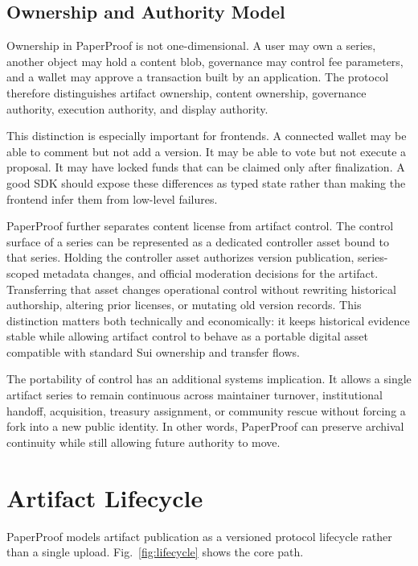 \documentclass[journal]{IEEEtran}
\begin{document}
\subsection{Ownership and Authority Model}

Ownership in PaperProof is not one-dimensional. A user may own a series, another object may hold a content blob, governance may control fee parameters, and a wallet may approve a transaction built by an application. The protocol therefore distinguishes artifact ownership, content ownership, governance authority, execution authority, and display authority.

This distinction is especially important for frontends. A connected wallet may be able to comment but not add a version. It may be able to vote but not execute a proposal. It may have locked funds that can be claimed only after finalization. A good SDK should expose these differences as typed state rather than making the frontend infer them from low-level failures.

PaperProof further separates content license from artifact control. The control
surface of a series can be represented as a dedicated controller asset bound to
that series. Holding the controller asset authorizes version publication,
series-scoped metadata changes, and official moderation decisions for the
artifact. Transferring that asset changes operational control without rewriting
historical authorship, altering prior licenses, or mutating old version
records. This distinction matters both technically and economically: it keeps
historical evidence stable while allowing artifact control to behave as a
portable digital asset compatible with standard Sui ownership and transfer
flows.

The portability of control has an additional systems implication. It allows a
single artifact series to remain continuous across maintainer turnover,
institutional handoff, acquisition, treasury assignment, or community rescue
without forcing a fork into a new public identity. In other words, PaperProof
can preserve archival continuity while still allowing future authority to move.

\section{Artifact Lifecycle}

PaperProof models artifact publication as a versioned protocol lifecycle rather than a single upload. Fig.~\ref{fig:lifecycle} shows the core path.
\end{document}
